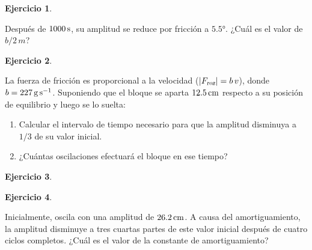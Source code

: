 \documentclass[a4paper,12pt,twoside]{book}
\newtheorem{ejercicio}{{Ejercicio}}[chapter]
\begin{document}
\begin{mdframed}[style=ejercicio-facil]
    \begin{ejercicio}
    \end{ejercicio}
    Después de $1000 \, \si{\second}$, su amplitud se reduce por fricción a $\ang{5.5}$.
    ¿Cuál es el valor de $b / 2 \, m$?
\end{mdframed}

\begin{mdframed}[style=ejercicio-intermedio]
    \begin{ejercicio}
    \end{ejercicio}
    \begin{center}
        \def\svgwidth{0.7\linewidth}
        
    \end{center}
    La fuerza de fricción es proporcional a la velocidad (${\left| {{{F}_\textsl{{roz}}}} \right|} = b \, v$), donde $b = 227 \, \si{\gram\per\second}$.
    Suponiendo que el bloque se aparta $12.5 \, \si{\centi\metre}$ respecto a su posición de equilibrio y luego se lo suelta:
    \begin{enumerate}
        \item Calcular el intervalo de tiempo necesario para que la amplitud disminuya a $1/3$ de su valor inicial.
        \item ¿Cuántas oscilaciones efectuará el bloque en ese tiempo?
    \end{enumerate}
\end{mdframed}

\begin{mdframed}[style=ejercicio-conceptual]
    \begin{ejercicio}
    \end{ejercicio}
\end{mdframed}

\begin{mdframed}[style=ejercicio-intermedio]
    \begin{ejercicio}
    \end{ejercicio}
    Inicialmente, oscila con una amplitud de $26.2 \, \si{\centi\metre}$.
    A causa del amortiguamiento, la amplitud disminuye a tres cuartas partes de este valor inicial después de cuatro ciclos completos.
    ¿Cuál es el valor de la constante de amortiguamiento?
\end{mdframed}
\end{document}
